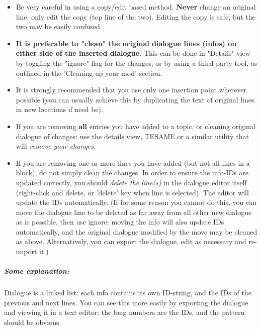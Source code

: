 \begin{itemize}
\item
  Be very careful in using a copy/edit based method. \textbf{Never}
  change an original line: only edit the copy (top line of the two).
  Editing the copy is safe, but the two may be easily confused.
\item
  \textbf{It is preferable to "clean" the original dialogue lines
  (infos) on either side of the inserted dialogue.} This can be done in
  "Details" view by toggling the "ignore" flag for the changes, or by
  using a third-party tool, as outlined in the 'Cleaning up your mod'
  section.
\item
  It is strongly recommended that you use only one insertion point
  wherever possible (you can usually achieve this by duplicating the
  text of original lines in new locations if need be).
\item
  If you are removing \textbf{all} entries you have added to a topic, or
  cleaning original dialogue of changes: use the details view, TESAME or
  a similar utility that will \emph{remove your changes}.
\item
  If you are removing one or more lines you have added (but not all
  lines in a block), do not simply clean the changes. In order to ensure
  the info-IDs are updated correctly, you should \emph{delete the
  line(s)} in the dialogue editor itself (right-click and delete, or
  'delete' key when line is selected). The editor will update the IDs
  automatically. (If for some reason you cannot do this, you can move
  the dialogue line to be deleted as far away from all other new
  dialogue as is possible, then use ignore: moving the info will also
  update IDs automatically, and the original dialogue modified by the
  move may be cleaned as above. Alternatively, you can export the
  dialogue, edit as necessary and re-import it.)
\end{itemize}

\hypertarget{some-explanation}{%
\subparagraph{Some explanation:}\label{some-explanation}}

Dialogue is a linked list: each info contains its own ID-string, and the
IDs of the previous and next lines. You can see this more easily by
exporting the dialogue and viewing it in a text editor: the long numbers
are the IDs, and the pattern should be obvious.

